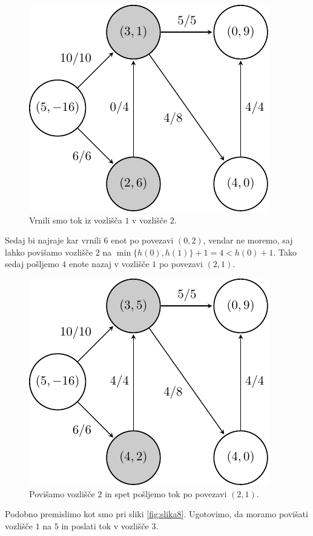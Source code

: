 \documentclass[mat1]{fmfdelo}
\begin{document}
\begin{figure}[H]
  \centering
  \includegraphics{images/graf2-10.pdf}
  \caption{Vrnili smo tok iz vozlišča $1$ v vozlišče $2$.}
  \label{fig:slika10}
\end{figure}

Sedaj bi najraje kar vrnili $6$ enot po povezavi $(0,2)$, vendar ne moremo, saj lahko povišamo vozlišče $2$ na $\min\{h(0), h(1)\} + 1 = 4 < h(0) + 1$. Tako sedaj pošljemo
$4$ enote nazaj v vozlišče $1$ po povezavi $(2,1)$.

\begin{figure}[H]
  \centering
  \includegraphics{images/graf2-11.pdf}
  \caption{Povišamo vozlišče $2$ in spet pošljemo tok po povezavi $(2,1)$.}
\end{figure}

Podobno premislimo kot smo pri sliki \ref{fig:slika8}. Ugotovimo, da moramo povišati vozlišče $1$ na $5$ in poslati tok v vozlišče $3$.
\end{document}
